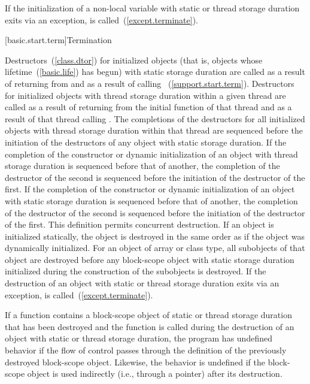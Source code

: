 \pnum
If the initialization of a non-local variable with static or thread storage duration
exits via
an exception,  is called~(\ref{except.terminate}).%

[basic.start.term]{Termination}

\pnum
{}%
%
%
Destructors~(\ref{class.dtor}) for initialized objects
(that is, objects whose lifetime~(\ref{basic.life}) has begun)
with static storage duration
are called as a result of returning from  and as a result of calling
%
%
~(\ref{support.start.term}).
Destructors for initialized objects with thread storage duration within a given thread
are called as a result of returning from the initial function of that thread and as a
result of that thread calling .
The completions of the destructors for all initialized objects with thread storage
duration within that thread are sequenced before the initiation of the destructors of
any object with static storage duration.
If the completion of the constructor or dynamic initialization of an object with thread
storage duration is sequenced before that of another, the completion of the destructor
of the second is sequenced before the initiation of the destructor of the first.
If the completion of the constructor or dynamic initialization of an object with static
storage duration is sequenced before that of another, the completion of the destructor
of the second is sequenced before the initiation of the destructor of the first.
\enternote This definition permits concurrent destruction. \exitnote If an object is
initialized statically, the object is destroyed in the same order as if
the object was dynamically initialized. For an object of array or class
type, all subobjects of that object are destroyed before any block-scope
object with static storage duration initialized during the construction
of the subobjects is destroyed.
If the destruction of an object with static or thread storage duration
exits via an exception,
 is called~(\ref{except.terminate}).

\pnum
If a function contains a block-scope object of static or thread storage duration that has been
destroyed and the function is called during the destruction of an object with static or
thread storage duration, the program has undefined behavior if the flow of control
passes through the definition of the previously destroyed block-scope object. Likewise, the
behavior is undefined if the block-scope object is used indirectly (i.e., through a
pointer) after its destruction.

